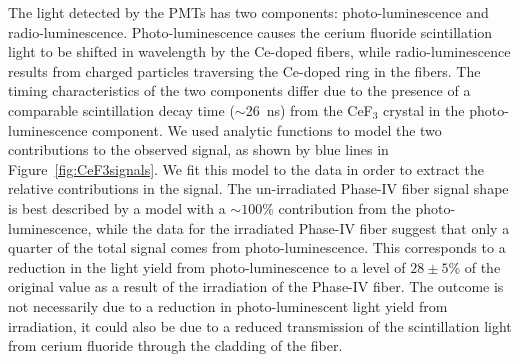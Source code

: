 \documentclass[a4paper,11pt]{article}
\begin{document}
The light detected by the PMTs has two components: photo-luminescence and radio-lumine\-scen\-ce. Photo-luminescence causes the cerium fluoride scintillation light to be shifted in wavelength by the Ce-doped fibers, while radio-lumines\-cen\-ce results from charged particles traversing the Ce-doped ring in the fibers. The timing characteristics of the two components differ due to the presence of a comparable scintillation decay time ($\sim$26~ns) from the CeF$_3$ crystal in the photo-luminescence component. We used analytic functions to model the two contributions to the observed signal, as shown by blue lines in Figure~\ref{fig:CeF3signals}. We fit this model to the data in order to extract the relative contributions in the signal. The un-irradiated Phase-IV fiber signal shape is best described by a model with a $\sim100$\% contribution from the photo-luminescence, while the data for the irradiated Phase-IV fiber suggest that only a quarter of the total signal comes from photo-luminescence. This corresponds to a reduction in the light yield from photo-luminescence to a level of $28 \pm 5$\% of the original value as a result of the irradiation of the Phase-IV fiber. The outcome is not necessarily due to a reduction in photo-luminescent light yield from irradiation, it could also be due to a reduced transmission of the scintillation light from cerium fluoride through the cladding of the fiber.
\end{document}
